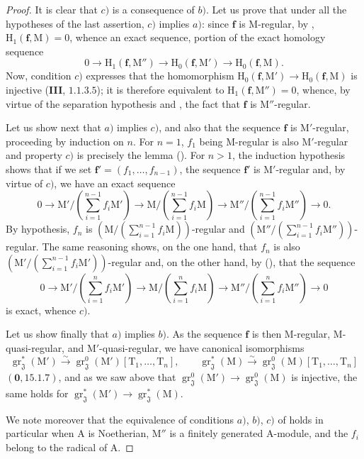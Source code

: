 \begin{proof}
It is clear that $c)$ is a consequence of $b)$. Let us prove that under all the hypotheses of the last assertion, $c)$ implies $a)$: since $\mathbf{f}$ is M-regular, by , $\mathrm{H}_1(\mathbf{f},\mathrm{M})=0$, whence an exact sequence, portion of the exact homology sequence
\[
  0\to\mathrm{H}_1(\mathbf{f},\mathrm{M}'')\to\mathrm{H}_0(\mathbf{f},\mathrm{M}')\to\mathrm{H}_0(\mathbf{f},\mathrm{M}).
\]
Now, condition $c)$ expresses that the homomorphism $\mathrm{H}_0(\mathbf{f},\mathrm{M}')\to\mathrm{H}_0(\mathbf{f},\mathrm{M})$ is injective (\textbf{III}, $1.1.3.5$); it is therefore equivalent to $\mathrm{H}_1(\mathbf{f},\mathrm{M}'')=0$, whence, by virtue of the separation hypothesis and , the fact that $\mathbf{f}$ is $\mathrm{M}''$-regular.

Let us show next that $a)$ implies $c)$, and also that the sequence $\mathbf{f}$ is $\mathrm{M}'$-regular, proceeding by induction on $n$. For $n=1$, $f_1$ being M-regular is also $\mathrm{M}'$-regular and property $c)$ is precisely the lemma (). For $n>1$, the induction hypothesis shows that
if we set $\mathbf{f}'=(f_1,\ldots,f_{n-1})$, the sequence $\mathbf{f}'$ is $\mathrm{M}'$-regular and, by virtue of $c)$, we have an exact sequence
\[
  0\to\mathrm{M}'/(\textstyle\sum_{i=1}^{n-1}f_i\mathrm{M}')\to\mathrm{M}/(\textstyle\sum_{i=1}^{n-1}f_i\mathrm{M})\to\mathrm{M}''/(\textstyle\sum_{i=1}^{n-1}f_i\mathrm{M}'')\to 0.
\]
By hypothesis, $f_n$ is $(\mathrm{M}/(\sum_{i=1}^{n-1}f_i\mathrm{M}))$-regular and $(\mathrm{M}''/(\sum_{i=1}^{n-1}f_i\mathrm{M}''))$-regular. The same reasoning shows, on the one hand, that $f_n$ is also $(\mathrm{M}'/(\sum_{i=1}^{n-1}f_i\mathrm{M}'))$-regular and, on the other hand, by (), that the sequence
\[
  0\to\mathrm{M}'/(\textstyle\sum_{i=1}^{n}f_i\mathrm{M}')\to\mathrm{M}/(\textstyle\sum_{i=1}^{n}f_i\mathrm{M})\to\mathrm{M}''/(\textstyle\sum_{i=1}^{n}f_i\mathrm{M}'')\to 0
\]
is exact, whence $c)$.

Let us show finally that $a)$ implies $b)$. As the sequence $\mathbf{f}$ is then M-regular, M-quasi-regular, and $\mathrm{M}'$-quasi-regular, we have canonical isomorphisms
\[
  \operatorname{gr}_\mathfrak{J}^*(\mathrm{M}')\xrightarrow{\sim}\operatorname{gr}_\mathfrak{J}^0(\mathrm{M}')[\mathrm{T}_1,\ldots,\mathrm{T}_n],\qquad
  \operatorname{gr}_\mathfrak{J}^*(\mathrm{M})\xrightarrow{\sim}\operatorname{gr}_\mathfrak{J}^0(\mathrm{M})[\mathrm{T}_1,\ldots,\mathrm{T}_n]
\]
$(\mathbf{0},15.1.7)$, and as we saw above that $\operatorname{gr}_\mathfrak{J}^0(\mathrm{M}')\to\operatorname{gr}_\mathfrak{J}^0(\mathrm{M})$ is injective, the same holds for $\operatorname{gr}_\mathfrak{J}^*(\mathrm{M}')\to\operatorname{gr}_\mathfrak{J}^*(\mathrm{M})$.

We note moreover that the equivalence of conditions $a)$, $b)$, $c)$ of  holds in particular when $\mathrm{A}$ is Noetherian, $\mathrm{M}''$ is a finitely generated $\mathrm{A}$-module, and the $f_i$ belong to the radical of $\mathrm{A}$.
\end{proof}

